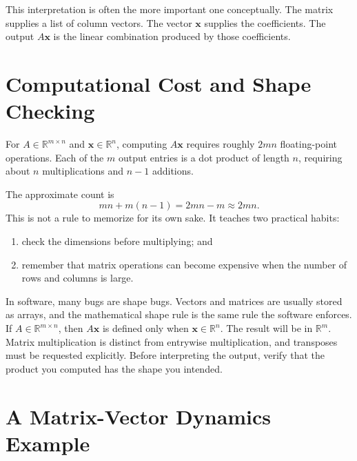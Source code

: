 This interpretation is often the more important one conceptually. The matrix supplies a list of column vectors. The vector \(\mathbf{x}\) supplies the coefficients. The output \(A\mathbf{x}\) is the linear combination produced by those coefficients.

\section{Computational Cost and Shape Checking}
\label{mf:computational-matrix-operations}

For \(A\in\mathbb{R}^{m\times n}\) and \(\mathbf{x}\in\mathbb{R}^n\), computing \(A\mathbf{x}\) requires roughly \(2mn\) floating-point operations. Each of the \(m\) output entries is a dot product of length \(n\), requiring about \(n\) multiplications and \(n-1\) additions.

The approximate count is
\[
    mn + m(n-1) = 2mn-m \approx 2mn.
\]
This is not a rule to memorize for its own sake. It teaches two practical habits:
\begin{enumerate}
    \item check the dimensions before multiplying; and
    \item remember that matrix operations can become expensive when the number of rows and columns is large.
\end{enumerate}

In software, many bugs are shape bugs. Vectors and matrices are usually stored as arrays, and the mathematical shape rule is the same rule the software enforces. If \(A\in\mathbb{R}^{m\times n}\), then \(A\mathbf{x}\) is defined only when \(\mathbf{x}\in\mathbb{R}^n\). The result will be in \(\mathbb{R}^m\). Matrix multiplication is distinct from entrywise multiplication, and transposes must be requested explicitly. Before interpreting the output, verify that the product you computed has the shape you intended.

\section{A Matrix-Vector Dynamics Example}
\label{mf:epidemic-dynamics-matrix-vector}

